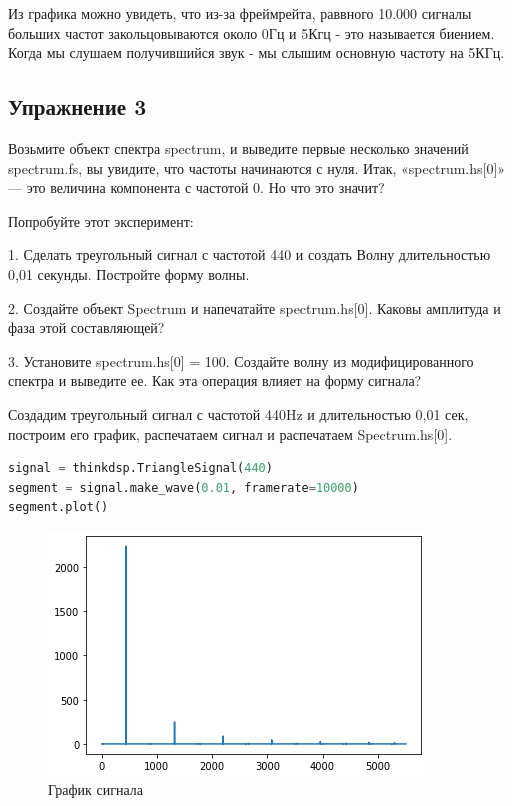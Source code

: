 Из графика можно увидеть, что из-за фреймрейта, раввного 10.000 сигналы больших частот закольцовываются около 0Гц и 5Кгц - это называется биением. Когда мы слушаем получившийся звук - мы слышим основную частоту на 5КГц.


\subsection{Упражнение 3}

Возьмите объект спектра spectrum, и выведите первые несколько значений spectrum.fs, вы увидите, что частоты начинаются с нуля. Итак, «spectrum.hs[0]» — это величина компонента с частотой 0. Но что это значит?

\noindent Попробуйте этот эксперимент:

1. Сделать треугольный сигнал с частотой 440 и создать Волну длительностью 0,01 секунды. Постройте форму волны.

2. Создайте объект Spectrum и напечатайте spectrum.hs[0]. Каковы амплитуда и фаза этой составляющей?

3. Установите spectrum.hs[0] = 100. Создайте волну из модифицированного спектра и выведите ее. Как эта операция влияет на форму сигнала?

Создадим треугольный сигнал с частотой 440Hz и длительностью 0,01 сек, построим его график, распечатаем сигнал и распечатаем Spectrum.hs[0].


\begin{lstlisting}[language=Python]
signal = thinkdsp.TriangleSignal(440)
segment = signal.make_wave(0.01, framerate=10000)
segment.plot()
\end{lstlisting}

\begin{figure}[H]
	\begin{center}
		\includegraphics[scale=1]{fig/lab02/lab2_6.png}
		\caption{График сигнала}
	\end{center}
\end{figure}

